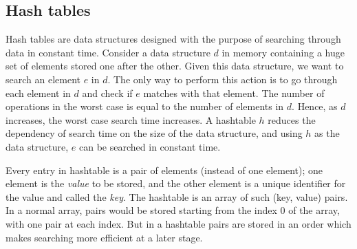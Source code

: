 



\subsection{Hash tables}
\label{sec:hash-tables}



Hash tables are data structures designed with the purpose of searching through data in constant time. Consider a data structure $d$ in memory containing a huge set of elements stored one after the other. Given this data structure, we want to search an element $e$ in $d$. The only way to perform this action is to go through each element in $d$ and check if $e$ matches with that element. The number of operations in the worst case is equal to the number of elements in $d$. Hence, as $d$ increases, the worst case search time increases. A hashtable $h$ reduces the dependency of search time on the size of the data structure, and using $h$ as the data structure, $e$ can be searched in constant time.

Every entry in hashtable is a pair of elements (instead of one element); one element is the \emph{value} to be stored, and the other element is a unique identifier for the value and called the \emph{key}. The hashtable is an array of such (key, value) pairs. In a normal array, pairs would be stored starting from the index 0 of the array, with one pair at each index. But in a hashtable pairs are stored in an order which makes searching more efficient at a later stage. 

